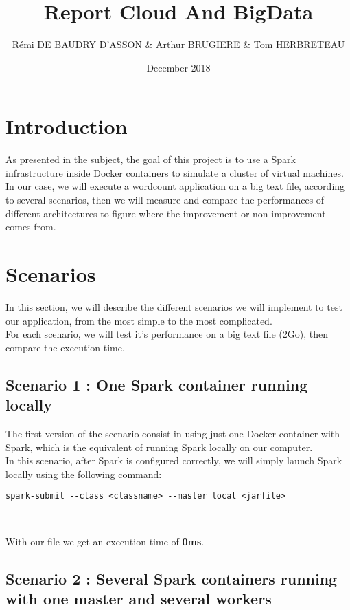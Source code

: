 \documentclass{article}
\title{Report Cloud And BigData}
\author{Rémi DE BAUDRY D'ASSON & Arthur BRUGIERE & Tom HERBRETEAU }
\date{December 2018}
\begin{document}
\maketitle

\section{Introduction}

As presented in the subject, the goal of this project is to use a Spark infrastructure inside Docker containers to simulate a cluster of virtual machines. \\

In our case, we will execute a wordcount application on a big text file, according to several scenarios, then we will measure and compare the performances of different architectures to figure where the improvement or non improvement comes from.

\section{Scenarios}

In this section, we will describe the different scenarios we will implement to test our application, from the most simple to the most complicated. \\

For each scenario, we will test it's performance on a big text file (2Go), then compare the execution time.

\subsection{Scenario 1 : One Spark container running locally}

The first version of the scenario consist in using just one Docker container with Spark, which is the equivalent of running Spark locally on our computer. \\

In this scenario, after Spark is configured correctly, we will simply launch Spark locally using the following command: 
\begin{verbatim}
spark-submit --class <classname> --master local <jarfile> 
\end{verbatim}
\ \

\noindent With our file we get an execution time of \textbf{0ms}.



\subsection{Scenario 2 : Several Spark containers running with one master and several workers}
\end{document}
